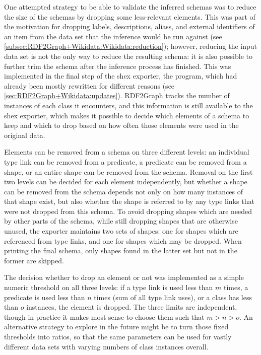 One attempted strategy to be able to validate the inferred \glspl{schema} %
was to reduce the size of the \glspl{schema} by dropping some less-relevant elements.
This was part of the motivation for dropping \glspl{label}, \glspl{description}, \glspl{alias}, and external identifiers of an \gls{item}
from the data set that the inference would be run against
(see \cref{subsec:RDF2Graph+Wikidata:Wikidata:reduction});
however, reducing the input data set is not the only way to reduce the resulting \gls{schema}:
it is also possible to further trim the \gls{schema} after the inference process has finished.
This was implemented in the final step of the \gls{shex} exporter,
the  program,
which had already been mostly rewritten for different reasons
(see \cref{sec:RDF2Graph+Wikidata:updates}).
\Gls{RDF2Graph} tracks the number of instances of each class it encounters,
and this information is still available to the \gls{shex} exporter,
which makes it possible to decide which elements of a \gls{schema} to keep and which to drop
based on how often those elements were used in the original data. %


Elements can be removed from a \gls{schema} on three different levels:
an individual type link can be removed from a \gls{predicate}, %
a \gls{predicate} can be removed from a \gls{shape},
or an entire \gls{shape} can be removed from the \gls{schema}.
Removal on the first two levels can be decided for each element independently,
but whether a \gls{shape} can be removed from the \gls{schema} depends not only on how many instances of that \gls{shape} exist,
but also whether the \gls{shape} is referred to by any type links that were not dropped from this \gls{schema}.
To avoid dropping \glspl{shape} which are needed by other parts of the \gls{schema},
while still dropping \glspl{shape} that are otherwise unused,
the exporter maintains two sets of \glspl{shape}:
one for \glspl{shape} which are referenced from type links,
and one for \glspl{shape} which may be dropped.
When printing the final \gls{schema}, only \glspl{shape} found in the latter set but not in the former are skipped.

The decision whether to drop an element or not
was implemented as a simple numeric threshold on all three levels:
if a type link is used less than $m$ times,
a \gls{predicate} is used less than $n$ times (sum of all type link uses),
or a class has less than $o$ instances,
the element is dropped.
The three limits are independent,
though in practice it makes most sense to choose them such that $m > n > o$.
An alternative strategy to explore in the future might be
to turn those fixed thresholds into ratios,
so that the same parameters can be used for vastly different data sets
with varying numbers of class instances overall.

